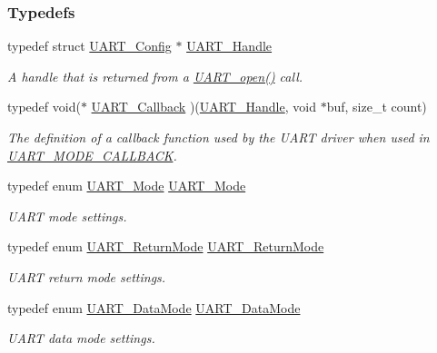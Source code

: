 \subsubsection*{Typedefs}
\begin{DoxyCompactItemize}
\item 
typedef struct \hyperlink{struct_u_a_r_t___config}{U\-A\-R\-T\-\_\-\-Config} $\ast$ \hyperlink{_u_a_r_t_8h_a13cc669fae768d8212e6491ce71b28af}{U\-A\-R\-T\-\_\-\-Handle}
\begin{DoxyCompactList}\small\item\em A handle that is returned from a \hyperlink{_u_a_r_t_8h_a0442ea1ec23901168da31726bb3254c1}{U\-A\-R\-T\-\_\-open()} call. \end{DoxyCompactList}\item 
typedef void($\ast$ \hyperlink{_u_a_r_t_8h_a74c489f070c575fb11654fe74302b5b8}{U\-A\-R\-T\-\_\-\-Callback} )(\hyperlink{_u_a_r_t_8h_a13cc669fae768d8212e6491ce71b28af}{U\-A\-R\-T\-\_\-\-Handle}, void $\ast$buf, size\-\_\-t count)
\begin{DoxyCompactList}\small\item\em The definition of a callback function used by the U\-A\-R\-T driver when used in \hyperlink{_u_a_r_t_8h_a2507a620dba95cd20885c52494d19e90ae0dbd9b5195e56c3c2aed10163523754}{U\-A\-R\-T\-\_\-\-M\-O\-D\-E\-\_\-\-C\-A\-L\-L\-B\-A\-C\-K}. \end{DoxyCompactList}\item 
typedef enum \hyperlink{_u_a_r_t_8h_a2507a620dba95cd20885c52494d19e90}{U\-A\-R\-T\-\_\-\-Mode} \hyperlink{_u_a_r_t_8h_a247ea9ec7b19a8e46dab1ac86b3eb0a7}{U\-A\-R\-T\-\_\-\-Mode}
\begin{DoxyCompactList}\small\item\em U\-A\-R\-T mode settings. \end{DoxyCompactList}\item 
typedef enum \hyperlink{_u_a_r_t_8h_acb5a82843435a1b5d51b6c27028d914f}{U\-A\-R\-T\-\_\-\-Return\-Mode} \hyperlink{_u_a_r_t_8h_a5fe0b5a28881f05c198e4226536cf62b}{U\-A\-R\-T\-\_\-\-Return\-Mode}
\begin{DoxyCompactList}\small\item\em U\-A\-R\-T return mode settings. \end{DoxyCompactList}\item 
typedef enum \hyperlink{_u_a_r_t_8h_a694090fdb166f94ac30b809f9cba87b8}{U\-A\-R\-T\-\_\-\-Data\-Mode} \hyperlink{_u_a_r_t_8h_a5d5d37ac84acc0ea543ef3737460d41a}{U\-A\-R\-T\-\_\-\-Data\-Mode}
\begin{DoxyCompactList}\small\item\em U\-A\-R\-T data mode settings. \end{DoxyCompactList}\item 

\end{DoxyCompactItemize}
